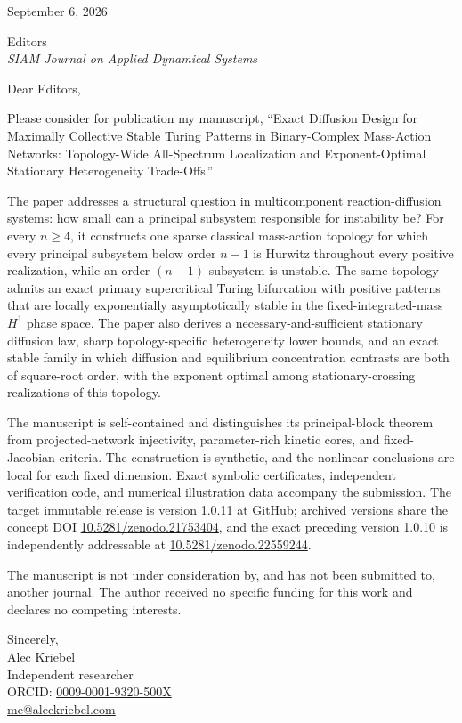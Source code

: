 \documentclass[11pt]{letter}
\begin{document}
\begin{flushright}
September 6, 2026
\end{flushright}

Editors\\
\emph{SIAM Journal on Applied Dynamical Systems}

Dear Editors,

Please consider for publication my manuscript, ``Exact Diffusion Design for
Maximally Collective Stable Turing Patterns in Binary-Complex Mass-Action
Networks: Topology-Wide All-Spectrum Localization and Exponent-Optimal
Stationary Heterogeneity Trade-Offs.''

The paper addresses a structural question in multicomponent reaction-diffusion
systems: how small can a principal subsystem responsible for instability be?
For every $n\geq4$, it constructs one sparse classical mass-action topology for
which every principal subsystem below order $n-1$ is Hurwitz throughout every
positive realization, while an order-$(n-1)$ subsystem is unstable. The same
topology admits an exact primary supercritical Turing bifurcation with positive
patterns that are locally exponentially asymptotically stable in the
fixed-integrated-mass $H^1$ phase space. The paper also derives a
necessary-and-sufficient stationary diffusion law, sharp topology-specific
heterogeneity lower bounds, and an exact stable family in which diffusion and
equilibrium concentration contrasts are both of square-root order, with the
exponent optimal among stationary-crossing realizations of this topology.

The manuscript is self-contained and distinguishes its principal-block theorem
from projected-network injectivity, parameter-rich kinetic cores, and
fixed-Jacobian criteria. The construction is synthetic, and the nonlinear
conclusions are local for each fixed dimension. Exact symbolic certificates,
independent verification code, and numerical illustration data accompany the
submission. The target immutable release is version 1.0.11 at
\href{https://github.com/AlecKriebel/Math/releases/tag/maximally-collective-stable-turing-v1.0.11}{GitHub};
archived versions share the concept DOI
\href{https://doi.org/10.5281/zenodo.21753404}{10.5281/zenodo.21753404}, and the
exact preceding version 1.0.10 is independently addressable at
\href{https://doi.org/10.5281/zenodo.22559244}{10.5281/zenodo.22559244}.

The manuscript is not under consideration by, and has not been submitted to,
another journal. The author received no specific funding for this work and
declares no competing interests.

Sincerely,\\[0.5em]
Alec Kriebel\\
Independent researcher\\
ORCID: \href{https://orcid.org/0009-0001-9320-500X}{0009-0001-9320-500X}\\
\href{mailto:me@aleckriebel.com}{me@aleckriebel.com}
\end{document}
